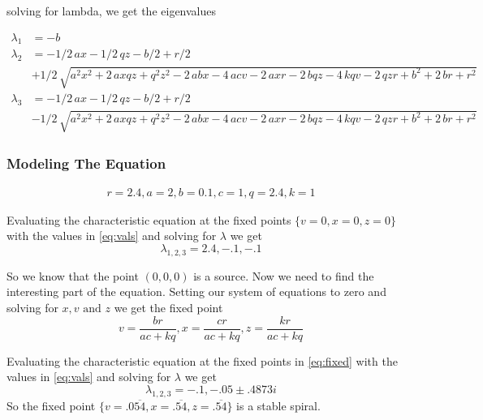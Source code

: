 \documentclass{article}
\begin{document}
solving for lambda, we get the eigenvalues

\begin{equation}
    \begin{split}
        \lambda_1 &=  -b\\
        \lambda_2 &= -1/2\,ax-1/2\,qz-b/2+r/2 \\ 
        &+1/2\,\sqrt {{a}^{2}{x}^{2}+2\,axqz+{q}^{2}{z} ^{2}-2\,abx-4\,acv-2\,axr-2\,bqz-4\,kqv-2\,qzr+{b}^{2}+2\,br+{r}^{2}} \\
        \lambda_3 &= -1/2\,ax-1/2\,qz-b/2+r/2 \\ 
        &-1/2\,\sqrt {{a}^{2}{x}^{2}+2\,axqz+{q}^{2}{z} ^{2}-2\,abx-4\,acv-2\,axr-2\,bqz-4\,kqv-2\,qzr+{b}^{2}+2\,br+{r}^{2}}
    \end{split}
\end{equation}


\subsubsection{Modeling The Equation}

\begin{equation}
    \begin{split}
        r = 2.4, a = 2, b=0.1,c=1,q=2.4,k=1
    \end{split}
    \label{eq:vals}
\end{equation}

Evaluating the characteristic equation at the fixed points $\{v = 0,x = 0,z = 0\}$ with the values in \ref{eq:vals} and solving for $\lambda$ we get
\begin{equation}
    \lambda_{1,2,3} = 2.4,-.1,-.1
\end{equation}

So we know that the point $(0,0,0)$ is a source. Now we need to find the interesting part of the equation. Setting our system of equations to zero and solving for $x,v\text{ and } z$ we get the fixed point
\begin{equation}
v ={\frac {br}{ac+kq}},x ={ \frac {cr}{ac+kq}},z={\frac {kr}{ac+kq}}
    \label{eq:fixed}
\end{equation}

Evaluating the characteristic equation at the fixed points in \ref{eq:fixed} with the values in \ref{eq:vals} and solving for $\lambda$ we get
\begin{equation}
    \lambda_{1,2,3} = -.1,-.05 \pm .4873i
\end{equation}
So the fixed point $\{v = .0\overline{54}, x = .\overline{54}, z =.\overline{54}\}$ is a stable spiral. 
\end{document}
